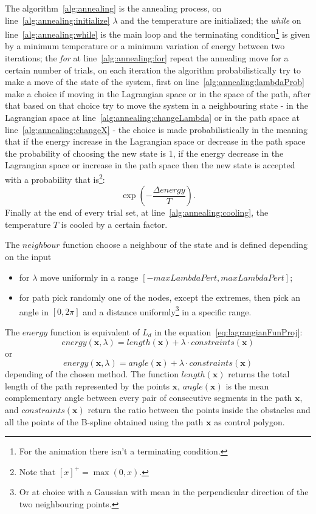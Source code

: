 \documentclass[a4paper]{article}
\begin{document}
The algorithm~\ref{alg:annealing} is the annealing process, on
line~\ref{alg:annealing:initialize} $\lambda$ and the
temperature are initialized; the \emph{while} on
line~\ref{alg:annealing:while} is the main loop and the terminating
condition\footnote{For the animation there isn't a terminating
  condition.} is given by a minimum temperature or a minimum variation of
energy between two iterations; the \emph{for} at
line~\ref{alg:annealing:for} repeat the annealing move for a certain
number of trials, on each iteration the algorithm probabilistically
try to make a move of the state of the system, first on
line~\ref{alg:annealing:lambdaProb} make a choice if moving in the
Lagrangian space or in the space of the path, after that based on that
choice try to move the system in a neighbouring state - in the
Lagrangian space at
line~\ref{alg:annealing:changeLambda} or in the path space at
line~\ref{alg:annealing:changeX} - the choice is made
probabilistically in the meaning that if the energy increase in the
Lagrangian space or decrease in the path space the probability of
choosing the new state is 1, if the energy decrease in the Lagrangian
space or increase in the path space then the new state is accepted
with a probability that is\footnote{Note that $[x]^+=\max(0,x)$.}:
$$\exp(-\frac{\Delta energy}{T}).$$
Finally at the end of every trial set,
at line~\ref{alg:annealing:cooling}, the temperature $T$ is cooled by
a certain factor.

The $neighbour$ function choose a neighbour of the state and is
defined depending on the input
\begin{itemize}
  \item for $\lambda$ move uniformly in a range $[-maxLambdaPert, maxLambdaPert]$;
  \item for path pick randomly one of the nodes, except the extremes,
    then pick an angle in $[0,2\pi]$ and a distance
    uniformly\footnote{Or at choice with a
      Gaussian with mean in the perpendicular direction of the two
      neighbouring points.} in a specific range.
\end{itemize}

The $energy$ function is equivalent of $L_d$ in the
equation~\eqref{eq:lagrangianFunProj}:
$$energy(\mathbf{x},\lambda)=length(\mathbf{x})+\lambda\cdot
constraints(\mathbf{x})$$
or
$$energy(\mathbf{x},\lambda)=angle(\mathbf{x})+\lambda\cdot
constraints(\mathbf{x})$$
depending of the chosen method. The function $length(\mathbf{x})$
returns the total length of the path represented by the points
$\mathbf{x}$, $angle(\mathbf{x})$ is the mean complementary angle between
every pair of consecutive segments in the path $\mathbf{x}$, and
$constraints(\mathbf{x})$ return the ratio between the points inside the
obstacles and all the points of the
B-spline obtained using the path $\mathbf{x}$ as control polygon.
\end{document}
